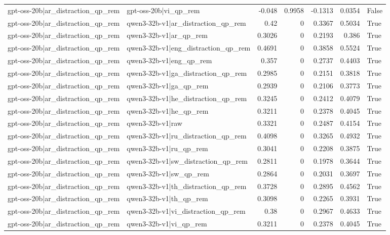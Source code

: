 \begin{table}
\begin{tabular}{l l r r r r l}
gpt-oss-20b|ar_distraction_qp_rem & gpt-oss-20b|vi_qp_rem & -0.048 & 0.9958 & -0.1313 & 0.0354 & False \\
gpt-oss-20b|ar_distraction_qp_rem & qwen3-32b-v1|ar_distraction_qp_rem & 0.42 & 0 & 0.3367 & 0.5034 & True \\
gpt-oss-20b|ar_distraction_qp_rem & qwen3-32b-v1|ar_qp_rem & 0.3026 & 0 & 0.2193 & 0.386 & True \\
gpt-oss-20b|ar_distraction_qp_rem & qwen3-32b-v1|eng_distraction_qp_rem & 0.4691 & 0 & 0.3858 & 0.5524 & True \\
gpt-oss-20b|ar_distraction_qp_rem & qwen3-32b-v1|eng_qp_rem & 0.357 & 0 & 0.2737 & 0.4403 & True \\
gpt-oss-20b|ar_distraction_qp_rem & qwen3-32b-v1|ga_distraction_qp_rem & 0.2985 & 0 & 0.2151 & 0.3818 & True \\
gpt-oss-20b|ar_distraction_qp_rem & qwen3-32b-v1|ga_qp_rem & 0.2939 & 0 & 0.2106 & 0.3773 & True \\
gpt-oss-20b|ar_distraction_qp_rem & qwen3-32b-v1|he_distraction_qp_rem & 0.3245 & 0 & 0.2412 & 0.4079 & True \\
gpt-oss-20b|ar_distraction_qp_rem & qwen3-32b-v1|he_qp_rem & 0.3211 & 0 & 0.2378 & 0.4045 & True \\
gpt-oss-20b|ar_distraction_qp_rem & qwen3-32b-v1|raw & 0.3321 & 0 & 0.2487 & 0.4154 & True \\
gpt-oss-20b|ar_distraction_qp_rem & qwen3-32b-v1|ru_distraction_qp_rem & 0.4098 & 0 & 0.3265 & 0.4932 & True \\
gpt-oss-20b|ar_distraction_qp_rem & qwen3-32b-v1|ru_qp_rem & 0.3041 & 0 & 0.2208 & 0.3875 & True \\
gpt-oss-20b|ar_distraction_qp_rem & qwen3-32b-v1|sw_distraction_qp_rem & 0.2811 & 0 & 0.1978 & 0.3644 & True \\
gpt-oss-20b|ar_distraction_qp_rem & qwen3-32b-v1|sw_qp_rem & 0.2864 & 0 & 0.2031 & 0.3697 & True \\
gpt-oss-20b|ar_distraction_qp_rem & qwen3-32b-v1|th_distraction_qp_rem & 0.3728 & 0 & 0.2895 & 0.4562 & True \\
gpt-oss-20b|ar_distraction_qp_rem & qwen3-32b-v1|th_qp_rem & 0.3098 & 0 & 0.2265 & 0.3931 & True \\
gpt-oss-20b|ar_distraction_qp_rem & qwen3-32b-v1|vi_distraction_qp_rem & 0.38 & 0 & 0.2967 & 0.4633 & True \\
gpt-oss-20b|ar_distraction_qp_rem & qwen3-32b-v1|vi_qp_rem & 0.3211 & 0 & 0.2378 & 0.4045 & True \\

\end{tabular}
\end{table}
